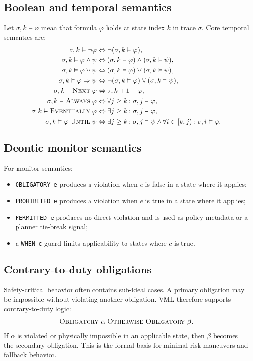 \documentclass[11pt,a4paper]{article}
\newcommand{\VML}{\textsc{VML}}
\begin{document}
\subsection{Boolean and temporal semantics}
Let $\sigma,k \vDash \varphi$ mean that formula $\varphi$ holds at state index $k$ in trace $\sigma$. Core temporal semantics are:
\begin{align*}
\sigma,k \vDash \neg\varphi &\Leftrightarrow \neg(\sigma,k \vDash \varphi),\\
\sigma,k \vDash \varphi \land \psi &\Leftrightarrow (\sigma,k \vDash \varphi) \land (\sigma,k \vDash \psi),\\
\sigma,k \vDash \varphi \lor \psi &\Leftrightarrow (\sigma,k \vDash \varphi) \lor (\sigma,k \vDash \psi),\\
\sigma,k \vDash \varphi \Rightarrow \psi &\Leftrightarrow \neg(\sigma,k \vDash \varphi) \lor (\sigma,k \vDash \psi),\\
\sigma,k \vDash \textsc{Next}\ \varphi &\Leftrightarrow \sigma,k+1 \vDash \varphi,\\
\sigma,k \vDash \textsc{Always}\ \varphi &\Leftrightarrow \forall j \ge k : \sigma,j \vDash \varphi,\\
\sigma,k \vDash \textsc{Eventually}\ \varphi &\Leftrightarrow \exists j \ge k : \sigma,j \vDash \varphi,\\
\sigma,k \vDash \varphi\ \textsc{Until}\ \psi &\Leftrightarrow \exists j \ge k : \sigma,j \vDash \psi \land \forall i \in [k,j): \sigma,i \vDash \varphi.
\end{align*}

\subsection{Deontic monitor semantics}
For monitor semantics:
\begin{itemize}
  \item \texttt{OBLIGATORY e} produces a violation when $e$ is false in a state where it applies;
  \item \texttt{PROHIBITED e} produces a violation when $e$ is true in a state where it applies;
  \item \texttt{PERMITTED e} produces no direct violation and is used as policy metadata or a planner tie-break signal;
  \item a \texttt{WHEN c} guard limits applicability to states where $c$ is true.
\end{itemize}

\subsection{Contrary-to-duty obligations}
Safety-critical behavior often contains sub-ideal cases. A primary obligation may be impossible without violating another obligation. \VML{} therefore supports contrary-to-duty logic:
\[
  \textsc{Obligatory}\ \alpha \ \textsc{Otherwise Obligatory}\ \beta.
\]
If $\alpha$ is violated or physically impossible in an applicable state, then $\beta$ becomes the secondary obligation. This is the formal basis for minimal-risk maneuvers and fallback behavior.
\end{document}

